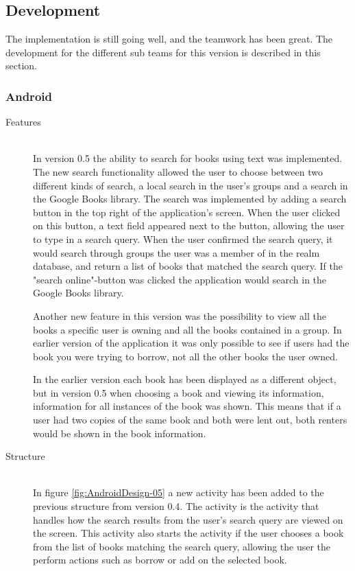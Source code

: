 \subsection{Development}
The implementation is still going well, and the teamwork has been great. The development for the different sub teams for this version is described in this section.
\subsubsection{Android}
\begin{description}
    \item[Features] \hfill\\
In version 0.5 the ability to search for books using text was implemented. The new search functionality allowed the user to choose between two different kinds of search, a local search in the user's groups and a search in the Google Books library. The search was implemented by adding a search button in the top right of the application's screen. When the user clicked on this button, a text field appeared next to the button, allowing the user to type in a search query. When the user confirmed the search query, it would search through groups the user was a member of in the realm database, and return a list of books that matched the search query. If the "search online"-button was clicked the application would search in the Google Books library.

Another new feature in this version was the possibility to view all the books a specific user is owning and all the books contained in a group. In earlier version of the application it was only possible to see if users had the book you were trying to borrow, not all the other books the user owned.

In the earlier version each book has been displayed as a different object, but in version 0.5 when choosing a book and viewing its information, information for all instances of the book was shown. This means that if a user had two copies of the same book and both were lent out, both renters would be shown in the book information. 

    \item[Structure] \hfill\\
In figure \ref{fig:AndroidDesign-05} a new activity has been added to the previous structure from version 0.4. The activity  is the activity that handles how the search results from the user's search query are viewed on the screen. This activity also starts the  activity if the user chooses a book from the list of books matching the search query, allowing the user the perform actions such as borrow or add on the selected book.


\end{description}
